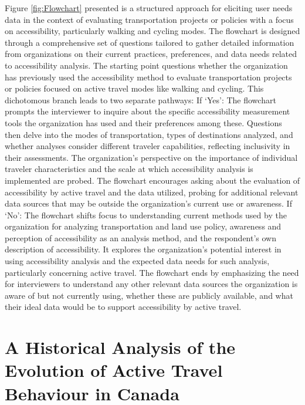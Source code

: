 \documentclass[
11pt, %
oneside, %
english, %
singlespacing, %
]{macthesis} %
\begin{document}
Figure \ref{fig:Flowchart} presented is a structured approach for eliciting user needs data in the context of evaluating transportation projects or policies with a focus on accessibility, particularly walking and cycling modes. The flowchart is designed through a comprehensive set of questions tailored to gather detailed information from organizations on their current practices, preferences, and data needs related to accessibility analysis. The starting point questions whether the organization has previously used the accessibility method to evaluate transportation projects or policies focused on active travel modes like walking and cycling. This dichotomous branch leads to two separate pathways:
If `Yes':
The flowchart prompts the interviewer to inquire about the specific accessibility measurement tools the organization has used and their preferences among these.
Questions then delve into the modes of transportation, types of destinations analyzed, and whether analyses consider different traveler capabilities, reflecting inclusivity in their assessments.
The organization's perspective on the importance of individual traveler characteristics and the scale at which accessibility analysis is implemented are probed.
The flowchart encourages asking about the evaluation of accessibility by active travel and the data utilized, probing for additional relevant data sources that may be outside the organization's current use or awareness.
If `No':
The flowchart shifts focus to understanding current methods used by the organization for analyzing transportation and land use policy, awareness and perception of accessibility as an analysis method, and the respondent's own description of accessibility.
It explores the organization's potential interest in using accessibility analysis and the expected data needs for such analysis, particularly concerning active travel.
The flowchart ends by emphasizing the need for interviewers to understand any other relevant data sources the organization is aware of but not currently using, whether these are publicly available, and what their ideal data would be to support accessibility by active travel.

\hypertarget{math-sci}{%
\chapter{A Historical Analysis of the Evolution of Active Travel Behaviour in Canada}\label{math-sci}}
\end{document}
